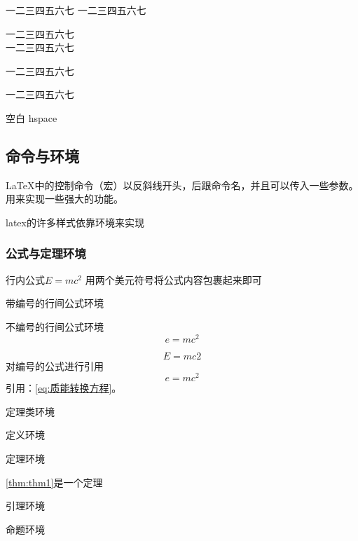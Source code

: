 \documentclass[../../main.tex]{subfiles}
\begin{document}
一二三四五六七
一二三四五六七

一二三四五六七\\
一二三四五六七

一二三四五六七\par
一二三四五六七

空白
hspace





\subsection{命令与环境}


LaTeX中的控制命令（宏）以反斜线开头，后跟命令名，并且可以传入一些参数。
用来实现一些强大的功能。



latex的许多样式依靠环境来实现


\subsubsection{公式与定理环境}

行内公式$E=mc^2$ 用两个美元符号将公式内容包裹起来即可


带编号的行间公式环境

不编号的行间公式环境
\[
e=mc^{2}
\]

\begin{equation}
E=mc2
\end{equation}
对编号的公式进行引用
\begin{equation}
  \label{eq:质能转换方程}
e=mc^{2}
\end{equation}
引用：\autoref{eq:质能转换方程}。





定理类环境

\begin{definition}\label{1}

定义环境
\end{definition}

\begin{theorem}\label{2}

定理环境
\end{theorem}

\autoref{thm:thm1}是一个定理

\begin{lemma}\label{3}
引理环境
\end{lemma}


\begin{proposition}\label{4}
命题环境
\end{proposition}
\end{document}
